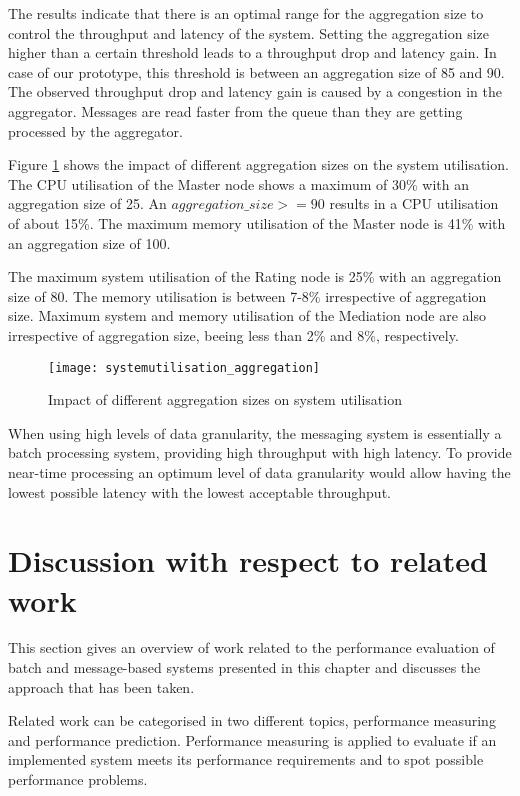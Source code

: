 The results indicate that there is an optimal range for the aggregation size to control the throughput and latency of the system. Setting the aggregation size higher than a certain threshold leads to a throughput drop and latency gain. In case of our prototype, this threshold is between an aggregation size of 85 and 90. The observed throughput drop and latency gain is caused by a congestion in the aggregator. Messages are read faster from the queue than they are getting processed by the aggregator.

Figure \ref{fig:ch4_systemutilisation_aggregation} shows the impact of different aggregation sizes on the system utilisation. The CPU utilisation of the Master node shows a maximum of 30\% with an aggregation size of 25. An $aggregation\_size >= 90$ results in a CPU utilisation of about 15\%. The maximum memory utilisation of the Master node is 41\% with an aggregation size of 100.

The maximum system utilisation of the Rating node is 25\% with an aggregation size of 80. The memory utilisation is between 7-8\% irrespective of aggregation size. Maximum system and memory utilisation of the Mediation node are also irrespective of aggregation size, beeing less than 2\% and 8\%, respectively.

\begin{figure}[htbp]
	\centering
	\texttt{[image: systemutilisation\_aggregation]}
	\caption{Impact of different aggregation sizes on system utilisation}
	\label{fig:ch4_systemutilisation_aggregation}
\end{figure}

When using high levels of data granularity, the messaging system is essentially a batch processing system, providing high throughput with high latency. To provide near-time processing an optimum level of data granularity would allow having the lowest possible latency with the lowest acceptable throughput.

\section{Discussion with respect to related work}\label{sec:ch4_related_work}
This section gives an overview of work related to the performance evaluation of batch and message-based systems presented in this chapter and discusses the approach that has been taken. 

Related work can be categorised in two different topics, performance measuring and performance prediction. 
Performance measuring is applied to evaluate if an implemented system meets its performance requirements and to spot possible performance problems.

